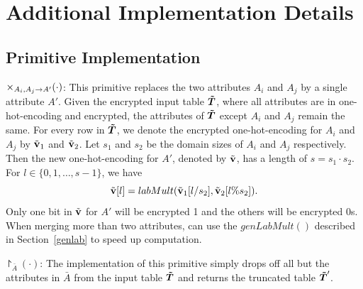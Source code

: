 \section{Additional Implementation Details}\label{app:implement}

\subsection{Primitive Implementation}\label{app:implement_primitives}

 $\times_{A_i,A_j\rightarrow A'}(\cdot)$: This primitive replaces the two attributes $A_i$ and $A_j$ by a single attribute $A'$. Given the encrypted input table $\boldsymbol{\tilde{T}}$, where all attributes are in one-hot-encoding and encrypted, the attributes of $\boldsymbol{\tilde{T}}$ except $A_i$ and $A_j$ remain the same. For every row in $\boldsymbol{\tilde{T}}$, we denote the encrypted one-hot-encoding for $A_i$ and $A_j$ by $\tilde{\bf{v}}_1$ and $\tilde{\bf{v}}_2$.  Let $s_1$ and $s_2$ be the domain sizes of $A_i$ and $A_j$ respectively. Then the new one-hot-encoding for $A'$, denoted by $\tilde{\bf{v}}$, has a length of $s=s_1\cdot s_2$. For $l\in \{0,1,\ldots, s-1\}$, we have $$\tilde{\bf{v}}[l] = labMult(\tilde{\bf{v}}_1[l/s_2], \tilde{\bf{v}}_2[l\%s_2]).$$
Only one bit in $\tilde{\bf{v}}$ for $A'$ will be encrypted 1 and the others will be encrypted 0s. When merging more than two attributes, \system can use the $genLabMult()$ described in Section~\ref{genlab} to speed up computation.



 $\project_{\bar{A}}(\cdot)$: The implementation of this primitive simply drops off all but the attributes in $\bar{A}$ from the input table $\boldsymbol{\tilde{T}}$ and returns the truncated table $\boldsymbol{\tilde{T}}'$.

